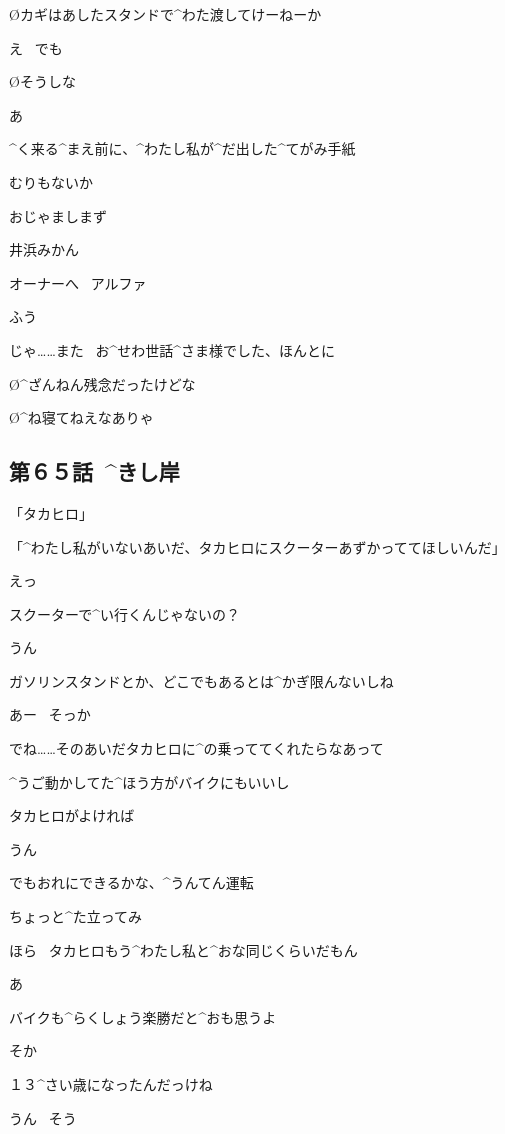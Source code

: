 \O カギはあしたスタンドで^{わた}{渡}してけーねーか

\K え
\ でも

\O そうしな

\page
\K あ

\K ^{く}{来}る^{まえ}{前}に、^{わたし}{私}が^{だ}{出}した^{てがみ}{手紙}

\K むりもないか

\page
\K おじゃましまず

\Sign 井浜みかん

\page
\Sign オーナーへ
\ アルファ

\page
\K ふう

\page
\K じゃ……また
\ お^{せわ}{世話}^{さま}{様}でした、ほんとに

\O ^{ざんねん}{残念}だったけどな

\O ^{ね}{寝}てねえなありゃ


\subsection{第６５話\ ^{きし}{岸}}

\page[146]
\A 「タカヒロ」

\page
\A 「^{わたし}{私}がいないあいだ、タカヒロにスクーターあずかっててほしいんだ」

\page
\T えっ

\T スクーターで^{い}{行}くんじゃないの？

\A うん

\A ガソリンスタンドとか、どこでもあるとは^{かぎ}{限}んないしね

\T あー
\ そっか

\page
\A でね……そのあいだタカヒロに^{の}{乗}っててくれたらなあって

\A ^{うご}{動}かしてた^{ほう}{方}がバイクにもいいし

\A タカヒロがよければ

\T うん

\T でもおれにできるかな、^{うんてん}{運転}

\A ちょっと^{た}{立}ってみ

\page
\A ほら
\ タカヒロもう^{わたし}{私}と^{おな}{同}じくらいだもん

\T あ

\A バイクも^{らくしょう}{楽勝}だと^{おも}{思}うよ

\T そか

\page
\A １３^{さい}{歳}になったんだっけね

\T うん
\ そう

